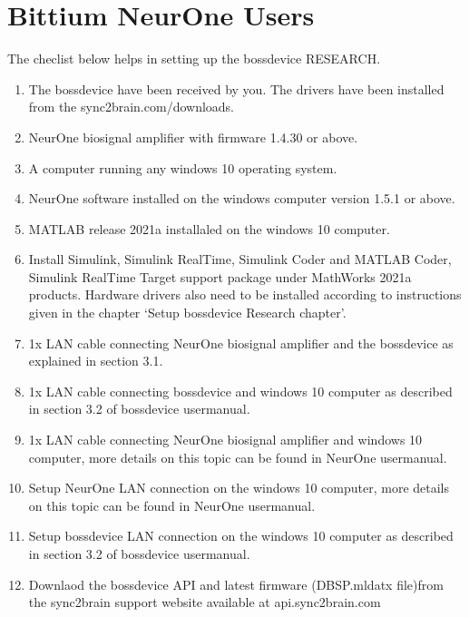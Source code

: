 \documentclass[letterpaper,10pt,english]{sphinxmanual}
\begin{document}
\section{Bittium NeurOne Users}
\label{\detokenize{1b_GettingStartedCheckList:bittium-neurone-users}}
\sphinxAtStartPar
The checlist below helps in setting up the bossdevice RESEARCH.
\begin{enumerate}
%
\item {} 
\sphinxAtStartPar
The bossdevice have been received by you. The drivers have been installed from the sync2brain.com/downloads.

\item {} 
\sphinxAtStartPar
NeurOne biosignal amplifier with firmware 1.4.30 or above.

\item {} 
\sphinxAtStartPar
A computer running any windows 10 operating system.

\item {} 
\sphinxAtStartPar
NeurOne software installed on the windows computer version 1.5.1 or above.

\item {} 
\sphinxAtStartPar
MATLAB release 2021a installaled on the windows 10 computer.

\item {} 
\sphinxAtStartPar
Install Simulink, Simulink Real\sphinxhyphen{}Time, Simulink Coder and MATLAB Coder, Simulink Real\sphinxhyphen{}Time Target support package under MathWorks 2021a products. Hardware drivers also need to be installed according to instructions given in the chapter ‘Setup bossdevice Research chapter’.

\item {} 
\sphinxAtStartPar
1x LAN cable connecting NeurOne biosignal amplifier and the bossdevice as explained in section 3.1.

\item {} 
\sphinxAtStartPar
1x LAN cable connecting bossdevice and windows 10 computer as described in section 3.2 of bossdevice usermanual.

\item {} 
\sphinxAtStartPar
1x LAN cable connecting NeurOne biosignal amplifier and windows 10 computer, more details on this topic can be found in NeurOne usermanual.

\item {} 
\sphinxAtStartPar
Setup NeurOne LAN connection on the windows 10 computer, more details on this topic can be found in NeurOne usermanual.

\item {} 
\sphinxAtStartPar
Setup bossdevice LAN connection on the windows 10 computer as described in section 3.2 of bossdevice usermanual.

\item {} 
\sphinxAtStartPar
Downlaod the bossdevice API and latest firmware (DBSP.mldatx file)from the sync2brain support website available at api.sync2brain.com

\end{enumerate}
\end{document}
